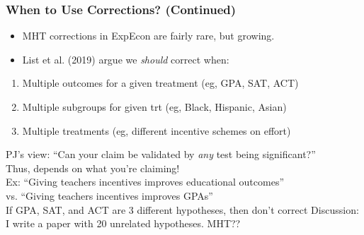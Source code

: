 
\begin{frame}
\frametitle{When to Use Corrections? (Continued)}
\begin{itemize}
    \item MHT corrections in ExpEcon are fairly rare, but growing.
    \item List et al. (2019) argue we \textit{should} correct when:
\end{itemize}
\begin{enumerate}
    \item Multiple outcomes for a given treatment (eg, GPA, SAT, ACT)
    \item Multiple subgroups for given trt (eg, Black, Hispanic, Asian)
    \item Multiple treatments (eg, different incentive schemes on effort)
\end{enumerate}
\br
PJ's view: ``Can your claim be validated by \emph{any} test being significant?''\\
Thus, depends on what you're claiming!\\
Ex: ``Giving teachers incentives improves educational outcomes''\\
vs. ``Giving teachers incentives improves GPAs''\\
\br
If GPA, SAT, and ACT are 3 different hypotheses, then don't correct
\br
Discussion: I write a paper with 20 unrelated hypotheses. MHT??
\end{frame}


